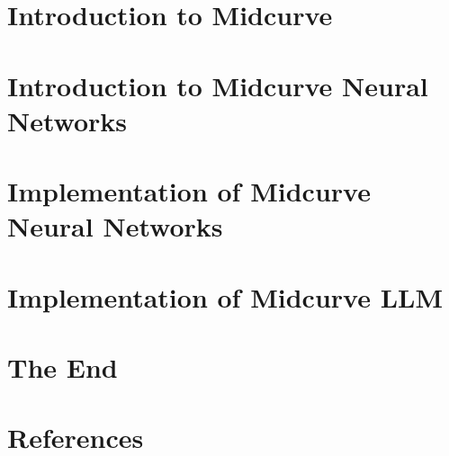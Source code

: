 \section[Midcurve]{Introduction to Midcurve}


\section[NN]{Introduction to Midcurve Neural Networks}


\section[NNIMPL]{Implementation of Midcurve Neural Networks}


\section[LLMIMPL]{Implementation of Midcurve LLM}


\section[End]{The End}


\section[Refs]{References}

